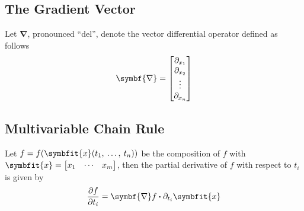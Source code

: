 \documentclass{article}
\begin{document}
\subsection{The Gradient Vector}
\begin{definition}
    Let $\symbf{\nabla}$, pronounced ``del'', denote the vector differential
    operator defined as follows
    \begin{equation*}
        \symbf{\nabla} = \mqty[\partial_{x_1} \\ \partial_{x_2} \\ \vdots \\ \partial_{x_n}]
    \end{equation*}
\end{definition}
\subsection{Multivariable Chain Rule}
\begin{definition}
    Let $f=f(\symbfit{x}(t_1,\: \ldots,\: t_n))$ be the composition of $f$ with
    $\symbfit{x}=\mqty[x_1 & \cdots & x_m]$, then the partial derivative of $f$
    with respect to $t_i$ is given by
    \begin{equation*}
        \pdv{f}{t_i} = \symbf{\nabla}f \vdot \partial_{t_i}\symbfit{x}
    \end{equation*}
\end{definition}
\end{document}
